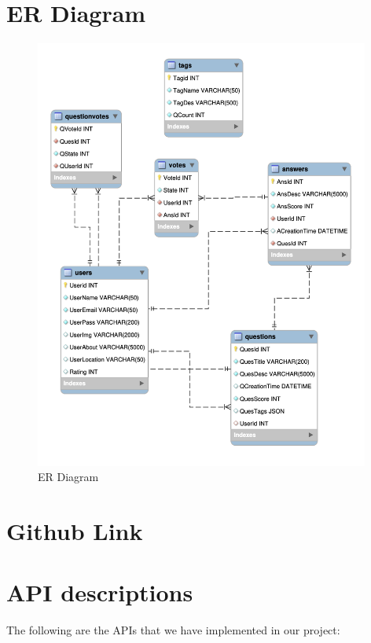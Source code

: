 \documentclass{article}
\begin{document}
\section{ER Diagram}



\begin{figure}[h]
    \centering
    \includegraphics[width=11cm]{ERD.png}
    \caption[short]{ER Diagram}
    \end{figure}




\section{Github Link}

\section{API descriptions}


The following are the APIs that we have implemented in our project:
\end{document}

